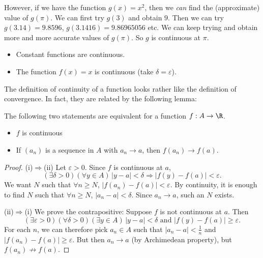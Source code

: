 \documentclass[a4paper]{article}
\begin{document}
However, if we have the function $g(x) = x^2$, then we \emph{can} find the (approximate) value of $g(\pi)$. We can first try $g(3)$ and obtain $9$. Then we can try $g(3.14) = 9.8596$, $g(3.1416) = 9.86965056$ etc. We can keep trying and obtain more and more accurate values of $g(\pi)$. So $g$ is continuous at $\pi$.

\begin{eg}\leavevmode
  \begin{itemize}
    \item Constant functions are continuous.
    \item The function $f(x) = x$ is continuous (take $\delta = \varepsilon$).
  \end{itemize}
\end{eg}

The definition of continuity of a function looks rather like the definition of convergence. In fact, they are related by the following lemma:

\begin{lemma}
  The following two statements are equivalent for a function $f: A\to \R$.
  \begin{itemize}
    \item $f$ is continuous
    \item If $(a_n)$ is a sequence in $A$ with $a_n \to a$, then $f(a_n) \to f(a)$.
  \end{itemize}
\end{lemma}

\begin{proof}
  (i)$\Rightarrow$(ii) Let $\varepsilon > 0$. Since $f$ is continuous at $a$,
  \[
    (\exists \delta > 0)(\forall y\in A)\, |y-a|< \delta \Rightarrow |f(y) - f(a)| < \varepsilon.
  \]
  We want $N$ such that $\forall n \geq N$, $|f(a_n) - f(a)| < \varepsilon$. By continuity, it is enough to find $N$ such that $\forall n\geq N$, $|a_n - a| < \delta$. Since $a_n \to a$, such an $N$ exists.

  (ii)$\Rightarrow$(i) We prove the contrapositive: Suppose $f$ is not continuous at $a$. Then
  \[
    (\exists \varepsilon > 0)(\forall \delta > 0)(\exists y\in A)\, |y - a| < \delta \text{ and }|f(y) - f(a)| \geq \varepsilon.
  \]
  For each $n$, we can therefore pick $a_n \in A$ such that $|a_n - a| < \frac{1}{n}$ and $|f(a_n) - f(a)| \geq \varepsilon$. But then $a_n \to a$ (by Archimedean property), but $f(a_n) \not\to f(a)$.
\end{proof}
\end{document}
